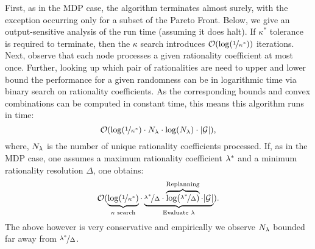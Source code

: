  First, as in the MDP case, the
algorithm terminates almost surely, with the exception occurring only
for a subset of the Pareto Front.  Below, we give an output-sensitive
analysis of the run time (assuming it does halt).  If $\kappa^*$
tolerance is required to terminate, then the $\kappa$ search
introduces $\mathcal{O}(\log(\nicefrac{1}{\kappa^*}))$
iterations. Next, observe that each node processes a given rationality
coefficient at most once. Further, looking up which pair of rationalities
are need to upper and lower bound the performance for a given randomness
can be in logarithmic time via binary search on rationality coefficients.
As the corresponding bounds and convex combinations can be computed in
constant time, this means this algorithm runs in time:
\begin{equation}
  \label{eq:sg-runtime}
  \mathcal{O}(\log(\nicefrac{1}{\kappa^*})\cdot N_\rat\cdot \log(N_\rat)\cdot |\sg|),
\end{equation}
where, $N_\lambda$ is the number of unique rationality coefficients
processed.  If, as in the MDP case, one assumes a maximum rationality
coefficient $\lambda^*$ and a minimum rationality resolution $\Delta$,
one obtains:
\begin{equation}
  \mathcal{O}(\underbrace{\log(\nicefrac{1}{\kappa^*})}_{\kappa \text{ search}}\cdot \underbrace{\nicefrac{\lambda^*}{\Delta}\cdot \overbrace{\log(\nicefrac{\lambda^*}{\Delta})}^{\text{Replanning}}\cdot |\mathcal{G}|}_{\text{Evaluate } \lambda}).
\end{equation}
The above however is very conservative and empirically we observe
$N_\lambda$ bounded far away from $\nicefrac{\lambda^*}{\Delta}$.



